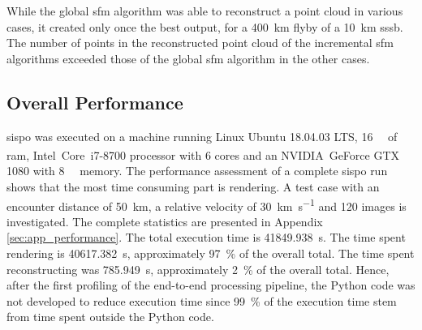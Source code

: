 \begin{table}[htb]
    \centering
    \caption{\Gls{sfm} algorithm with most reconstructed points for each scenario.}
    \label{tab:recon_best_algo}
\end{table}


While the global \gls{sfm} algorithm was able to reconstruct a point cloud in various cases, it created only once the best output, for a \SI{400}{\kilo\meter} flyby of a \SI{10}{\kilo\meter} \gls{sssb}. The number of points in the reconstructed point cloud of the incremental \gls{sfm} algorithms exceeded those of the global \gls{sfm} algorithm in the other cases.

\subsection{Overall Performance}
\gls{sispo} was executed on a machine running Linux Ubuntu 18.04.03 LTS, \SI{16}{\giga\byte} of \gls{ram}, Intel\textsuperscript{\textregistered}~Core\texttrademark~i7-8700 processor with \SI{6}{} cores and an NVIDIA\textsuperscript{\textregistered}~GeForce GTX 1080 with \SI{8}{\giga\byte} memory. The performance assessment of a complete \gls{sispo} run shows that the most time consuming part is rendering. 
A test case with an encounter distance of \SI{50}{\kilo\meter}, a relative velocity of \SI{30}{\kilo\meter\per\second} and \SI{120}{} images is investigated. The complete statistics are presented in Appendix \ref{sec:app_performance}. The total execution time is \SI{41849.938}{\second}. The time spent rendering is \SI{40617.382}{\second}, approximately \SI{97}{\percent} of the overall total. The time spent reconstructing was \SI{785.949}{\second}, approximately \SI{2}{\percent} of the overall total. Hence, after the first profiling of the end-to-end processing pipeline, the Python code was not developed to reduce execution time since \SI{99}{\percent} of the execution time stem from time spent outside the Python code.